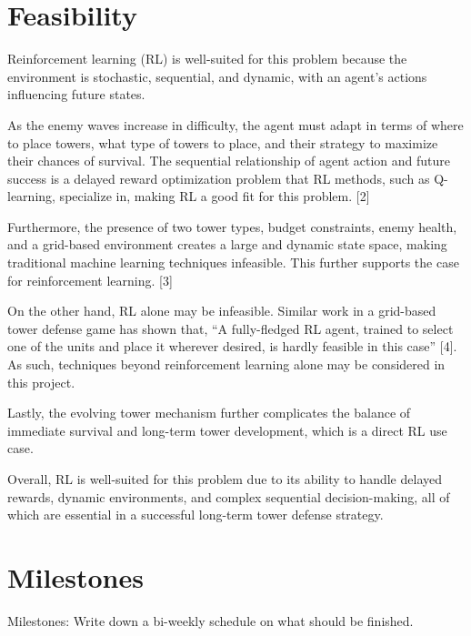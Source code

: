 \documentclass[12pt]{article}
\newcounter{ques}
\begin{document}
\section*{Feasibility}

Reinforcement learning (RL) is well-suited for this problem because the environment is stochastic, sequential, and dynamic, with an agent's actions influencing future states. \par 

As the enemy waves increase in difficulty, the agent must adapt in terms of where to place towers, what type of towers to place, and their strategy to maximize their chances of survival. The sequential relationship of agent action and future success is a delayed reward optimization problem that RL methods, such as Q-learning, specialize in, making RL a good fit for this problem. [2] \par

Furthermore, the presence of two tower types, budget constraints, enemy health, and a grid-based environment creates a large and dynamic state space, making traditional machine learning techniques infeasible. This further supports the case for reinforcement learning. [3] \par

On the other hand, RL alone may be infeasible. Similar work in a grid-based tower defense game has shown that, ``A fully-fledged RL agent, trained to select one of the units and place it wherever desired, is hardly feasible in this case'' [4]. As such, techniques beyond reinforcement learning alone may be considered in this project. \par

Lastly, the evolving tower mechanism further complicates the balance of immediate survival and long-term tower development, which is a direct RL use case. \par

Overall, RL is well-suited for this problem due to its ability to handle delayed rewards, dynamic environments, and complex sequential decision-making, all of which are essential in a successful long-term tower defense strategy.


\section*{Milestones}
Milestones: Write down a bi-weekly schedule on what should be finished.

\vspace{0.5em}
\newpage 
\end{document}
